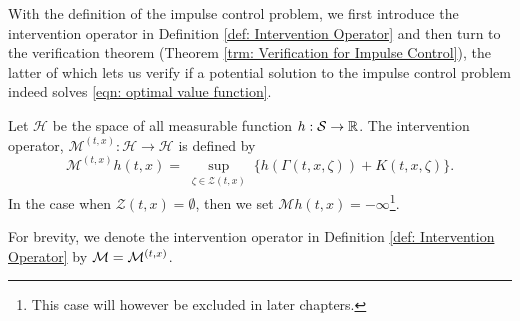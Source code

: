 With the definition of the impulse control problem, we first introduce the intervention operator in Definition \ref{def: Intervention Operator} and then turn to the verification theorem (Theorem \ref{trm: Verification for Impulse Control}), the latter of which lets us verify if a potential solution to the impulse control problem indeed solves \ref{eqn: optimal value function}.

\begin{definition}
\label{def: Intervention Operator}
    Let $\mathcal{H}$ be the space of all measurable function $h: \mathcal{S} \rightarrow \mathbb{R}$. The intervention operator, $\mathcal{M}^{(t,x)}: \mathcal{H} \rightarrow \mathcal{H}$ is defined by
    \begin{equation*}
        \mathcal{M}^{(t,x)}h(t,x) = \sup_{\substack{\zeta \in \mathcal{Z}(t,x)}} \{h(\Gamma(t,x,\zeta)) + K(t,x,\zeta)\}.
    \end{equation*}
    In the case when $\mathcal{Z}(t,x) = \emptyset$, then we set $\mathcal{M}h(t,x) = - \infty$\footnote{This case will however be excluded in later chapters.}. 
\end{definition}
\begin{remark}
    For brevity, we denote the intervention operator in Definition \ref{def: Intervention Operator} by $\mathcal{M} = \mathcal{M}^{(t,x)}$.
\end{remark}

